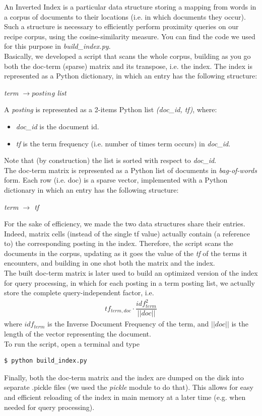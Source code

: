 An Inverted Index\cite{inv_ind} is a particular data structure storing a mapping from words in a corpus of documents to their locations (i.e. in which documents they occur). Such a structure is necessary to efficiently perform proximity queries on our recipe corpus, using the cosine-similarity measure. You can find the code we used for this purpose in \textit{build\_index.py}.\\
Basically, we developed a script that scans the whole corpus, building as you go both the doc-term (sparse) matrix\cite{doc_term} and its transpose, i.e. the index. The index is represented as a Python dictionary, in which an entry has the following structure:
\begin{center}
	\textit{term $\rightarrow postin$g list}
\end{center}
A \textit{posting} is represented as a 2-items Python list \textit{(doc\_id, tf)}, where:
\begin{itemize}
	\item \textit{doc\_id} is the document id.
	\item \textit{tf} is the term frequency (i.e. number of times term occurs) in \textit{doc\_id}.
\end{itemize}
Note that (by construction) the list is sorted with respect to \textit{doc\_id}.\\
The doc-term matrix is represented as a Python list of documents in \textit{bag-of-words} form. Each row (i.e. doc) is a sparse vector, implemented with a Python dictionary in which an entry has the following structure:
\begin{center}
	\textit{term $\rightarrow$ tf}
\end{center}
For the sake of efficiency, we made the two data structures share their entries. Indeed, matrix cells (instead of the single tf value) actually contain (a reference to) the corresponding posting in the index. Therefore, the script scans the documents in the corpus, updating as it goes the value of the \textit{tf} of the terms it encounters, and building in one shot both the matrix and the index.\\
The built doc-term matrix is later used to build an optimized version of the index for query processing, in which for each posting in a term posting list, we actually store the complete query-independent factor, i.e.
\begin{align*}
	tf_{term,doc} \cdot \dfrac{idf_{term}^2}{||doc||}
\end{align*}
where $idf_{term}$ is the Inverse Document Frequency\cite{tf_idf} of the term, and $||doc||$ is the length of the vector representing the document.\\
To run the script, open a terminal and type
\begin{lstlisting}
$ python build_index.py
\end{lstlisting}
Finally, both the doc-term matrix and the index are dumped on the disk into separate .pickle files (we used the \textit{pickle}\cite{pickle} module to do that). This allows for easy and efficient reloading of the index in main memory at a later time (e.g. when needed for query processing).



